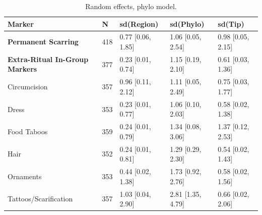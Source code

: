 \begin{table}[!ht]
\centering
\small
\caption{Random effects, phylo model.}
\label{tab:intonly_random_effects_phylo}
\begin{tabular}{lllll}
\toprule
Marker & N & sd(Region) & sd(Phylo) & sd(Tip) \\
\midrule
\textbf{Permanent Scarring} & 418 & 0.77 [0.06, 1.85] & 1.06 [0.05, 2.54] & 0.98 [0.05, 2.15] \\
\textbf{Extra-Ritual In-Group Markers} & 377 & 0.23 [0.01, 0.74] & 1.15 [0.19, 2.10] & 0.61 [0.03, 1.36] \\
\midrule
Circumcision & 357 & 0.96 [0.11, 2.12] & 1.11 [0.05, 2.49] & 0.75 [0.03, 1.77] \\
Dress & 353 & 0.23 [0.01, 0.77] & 1.06 [0.10, 2.03] & 0.58 [0.02, 1.38] \\
Food Taboos & 359 & 0.24 [0.01, 0.79] & 1.34 [0.08, 3.06] & 1.37 [0.12, 2.53] \\
Hair & 352 & 0.24 [0.01, 0.81] & 1.29 [0.29, 2.30] & 0.54 [0.02, 1.43] \\
Ornaments & 353 & 0.44 [0.02, 1.38] & 1.73 [0.92, 2.76] & 0.58 [0.02, 1.56] \\
Tattoos/Scarification & 357 & 1.03 [0.04, 2.90] & 2.81 [1.35, 4.79] & 0.66 [0.02, 2.06] \\
\bottomrule
\end{tabular}
\end{table}